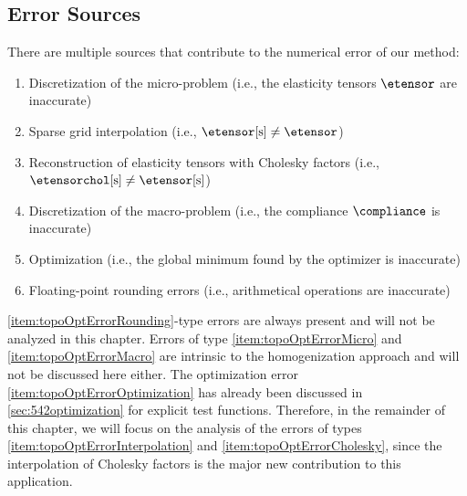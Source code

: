 \subsection{Error Sources}
\label{sec:642errorSources}

There are multiple sources that contribute to the numerical error
of our method:

\begin{enumerate}[label=E\arabic*.,ref=E\arabic*,leftmargin=2.7em]
  \item
  \label{item:topoOptErrorMicro}
  Discretization of the micro-problem
  (i.e., the elasticity tensors $\etensor$ are inaccurate)
  
  \item
  \label{item:topoOptErrorInterpolation}
  Sparse grid interpolation
  (i.e., $\etensorintp \not= \etensor$)
  
  \item
  \label{item:topoOptErrorCholesky}
  Reconstruction of elasticity tensors with Cholesky factors
  (i.e., $\etensorcholintp \not= \etensorintp$)
  
  \item
  \label{item:topoOptErrorMacro}
  Discretization of the macro-problem
  (i.e., the compliance $\compliance$ is inaccurate)
  
  \item
  \label{item:topoOptErrorOptimization}
  Optimization
  (i.e., the global minimum found by the optimizer is inaccurate)
  
  \item
  \label{item:topoOptErrorRounding}
  Floating-point rounding errors
  (i.e., arithmetical operations are inaccurate)
\end{enumerate}

\noindent
\ref{item:topoOptErrorRounding}-type errors are always present and
will not be analyzed in this chapter.
Errors of type \ref{item:topoOptErrorMicro} and \ref{item:topoOptErrorMacro}
are intrinsic to the homogenization approach
and will not be discussed here either.
The optimization error \ref{item:topoOptErrorOptimization}
has already been discussed in \cref{sec:542optimization}
for explicit test functions.
Therefore, in the remainder of this chapter,
we will focus on the analysis of the errors of types
\ref{item:topoOptErrorInterpolation} and \ref{item:topoOptErrorCholesky},
since the interpolation of Cholesky factors is the
major new contribution to this application.



